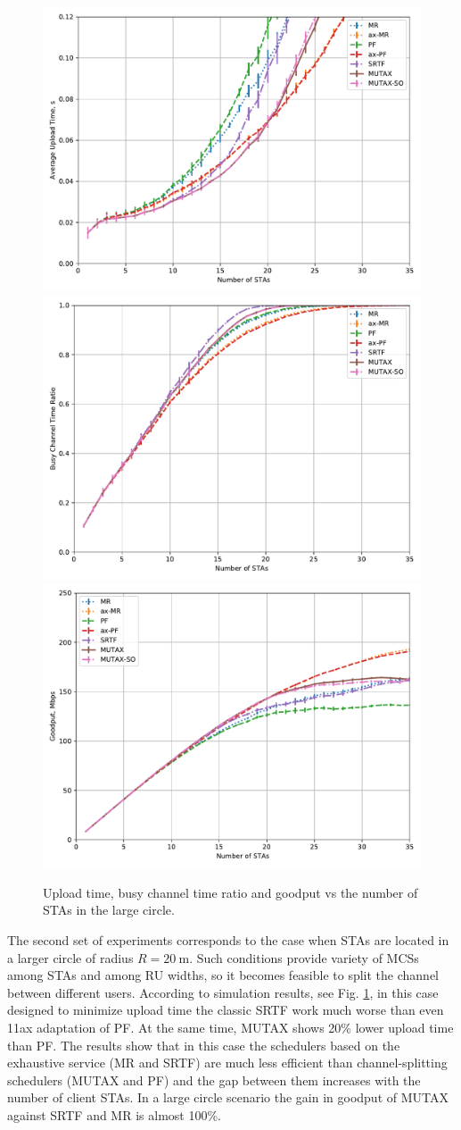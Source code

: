 \begin{figure}[bt]
	\centering
	\includegraphics[width = 0.32\linewidth]{20-d.pdf}
	\includegraphics[width = 0.32\linewidth]{20-e.pdf}
	\includegraphics[width = 0.32\linewidth]{20-t.pdf}
	\caption{\label{fig:25-e} Upload time, busy channel time ratio and goodput vs the number of STAs in the large circle.}
\end{figure}

The second set of experiments corresponds to the case when STAs are located in a larger circle of radius $R = \SI{20}{\m}$.
Such conditions provide variety of MCSs among STAs and among RU widths, so it becomes feasible to split the channel between different users.
According to simulation results, see Fig. \ref{fig:25-e}, in this case designed to minimize upload time the classic SRTF work much worse than even 11ax adaptation of PF. At the same time, MUTAX shows 20\% lower upload time than PF. The results show that in this case the schedulers based on the exhaustive service (MR and SRTF) are  much less efficient than channel-splitting schedulers (MUTAX and PF) and the gap between them increases with the number of client STAs. %
In a large circle scenario the gain in goodput of MUTAX against SRTF and MR is almost 100\%.


